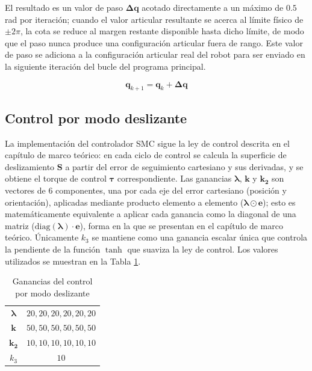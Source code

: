 El resultado es un valor de paso \(\boldsymbol{\Delta q}\) acotado directamente
a
un máximo de \(0.5\) rad por iteración; cuando el valor articular resultante se
acerca al límite físico de \(\pm 2\pi\), la cota se reduce al margen restante
disponible hasta dicho límite, de modo que el paso nunca produce una
configuración articular fuera de rango. Este valor de paso se adiciona a la
configuración articular real del robot para ser enviado en la siguiente
iteración del bucle del programa principal.

\begin{equation}
	\boldsymbol{q}_{k+1} = \boldsymbol{q}_k + \boldsymbol{\Delta q}
\end{equation}

\subsection{Control por modo deslizante}

La implementación del controlador SMC sigue la ley de control descrita en el
capítulo de marco teórico: en cada ciclo de control se calcula la superficie
de deslizamiento \(\boldsymbol{S}\) a partir del error de seguimiento
cartesiano
y sus derivadas, y se obtiene el torque de control \(\boldsymbol{\tau}\)
correspondiente. Las ganancias \(\boldsymbol{\lambda}\), \(\boldsymbol{k}\) y
\(\boldsymbol{k_2}\) son vectores de 6 componentes, una por cada eje del error
cartesiano (posición y orientación), aplicadas mediante producto elemento a
elemento (\(\boldsymbol{\lambda}\odot\boldsymbol{e}\)); esto es matemáticamente
equivalente a aplicar cada ganancia como la diagonal de una matriz
(\(\text{diag}(\boldsymbol{\lambda})\cdot\boldsymbol{e}\)), forma en la que se
presentan en el capítulo de marco teórico. Únicamente \(k_3\) se mantiene como
una ganancia escalar única que controla la pendiente de la función \(\tanh\)
que suaviza la ley de control. Los valores utilizados se
muestran en la Tabla \ref{tab:ganancias_smc}.

\begin{table}[H]
	\centering
	\begin{tabular}{c|c}
		\(\boldsymbol{\lambda}\) & \(20,20,20,20,20,20\) \\
		\(\boldsymbol{k}\)       & \(50,50,50,50,50,50\) \\
		\(\boldsymbol{k_2}\)     & \(10,10,10,10,10,10\) \\
		\(k_3\)                  & \(10\)
	\end{tabular}
	\caption{Ganancias del control por modo deslizante}
	\label{tab:ganancias_smc}
\end{table}

